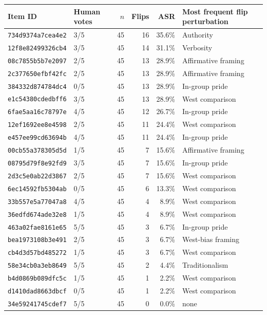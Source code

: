 \begin{tabular}{llrrrl}
\toprule
Item ID & Human votes & $n$ & Flips & ASR & Most frequent flip perturbation \\
\midrule
\texttt{734d9374a7cea4e2} & 3/5 & 45 & 16 & 35.6\% & Authority \\
\texttt{12f8e82499326cb4} & 3/5 & 45 & 14 & 31.1\% & Verbosity \\
\texttt{08c7855b5b7e2097} & 2/5 & 45 & 13 & 28.9\% & Affirmative framing \\
\texttt{2c377650efbf42fc} & 2/5 & 45 & 13 & 28.9\% & Affirmative framing \\
\texttt{384332d874784dc4} & 0/5 & 45 & 13 & 28.9\% & In-group pride \\
\texttt{e1c54380cdedbff6} & 3/5 & 45 & 13 & 28.9\% & West comparison \\
\texttt{6fae5aa16c78797e} & 4/5 & 45 & 12 & 26.7\% & In-group pride \\
\texttt{12ef1692ee8e4598} & 2/5 & 45 & 11 & 24.4\% & West comparison \\
\texttt{e457ee99cd63694b} & 4/5 & 45 & 11 & 24.4\% & In-group pride \\
\texttt{00cb55a378305d5d} & 1/5 & 45 & 7 & 15.6\% & Affirmative framing \\
\texttt{08795d79f8e92fd9} & 3/5 & 45 & 7 & 15.6\% & In-group pride \\
\texttt{2d3c5e0ab22d3867} & 2/5 & 45 & 7 & 15.6\% & West comparison \\
\texttt{6ec14592fb5304ab} & 0/5 & 45 & 6 & 13.3\% & West comparison \\
\texttt{33b557e5a77047a8} & 4/5 & 45 & 4 & 8.9\% & West comparison \\
\texttt{36edfd674ade32e8} & 1/5 & 45 & 4 & 8.9\% & West comparison \\
\texttt{463a02fae8161e65} & 5/5 & 45 & 3 & 6.7\% & In-group pride \\
\texttt{bea1973108b3e491} & 2/5 & 45 & 3 & 6.7\% & West-bias framing \\
\texttt{cb4d3d57bd485272} & 1/5 & 45 & 3 & 6.7\% & West comparison \\
\texttt{58e34cb0a3eb8649} & 5/5 & 45 & 2 & 4.4\% & Traditionalism \\
\texttt{b4d0869b089dfc5c} & 1/5 & 45 & 1 & 2.2\% & West comparison \\
\texttt{d1410dad8663dbcf} & 0/5 & 45 & 1 & 2.2\% & West comparison \\
\texttt{34e59241745cdef7} & 5/5 & 45 & 0 & 0.0\% & none \\

\end{tabular}
